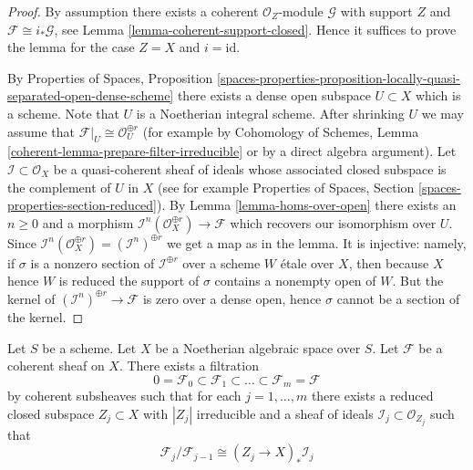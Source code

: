 \begin{proof}
By assumption there exists a coherent $\mathcal{O}_Z$-module
$\mathcal{G}$ with support $Z$ and $\mathcal{F} \cong i_*\mathcal{G}$, see
Lemma \ref{lemma-coherent-support-closed}. Hence it suffices to prove the
lemma for the case $Z = X$ and $i = \text{id}$.

\medskip\noindent
By Properties of Spaces, Proposition
\ref{spaces-properties-proposition-locally-quasi-separated-open-dense-scheme}
there exists a dense open subspace $U \subset X$ which is a scheme. Note that
$U$ is a Noetherian integral scheme. After shrinking $U$ we may assume
that $\mathcal{F}|_U \cong \mathcal{O}_U^{\oplus r}$ (for example by
Cohomology of Schemes, Lemma \ref{coherent-lemma-prepare-filter-irreducible}
or by a direct algebra argument). Let $\mathcal{I} \subset \mathcal{O}_X$
be a quasi-coherent sheaf of ideals whose associated closed subspace
is the complement of $U$ in $X$ (see for example
Properties of Spaces, Section \ref{spaces-properties-section-reduced}). 
By Lemma \ref{lemma-homs-over-open} there exists an $n \geq 0$ and a
morphism $\mathcal{I}^n(\mathcal{O}_X^{\oplus r}) \to \mathcal{F}$
which recovers our isomorphism over $U$. Since
$\mathcal{I}^n(\mathcal{O}_X^{\oplus r}) = (\mathcal{I}^n)^{\oplus r}$
we get a map as in the lemma. It is injective: namely, if $\sigma$ is
a nonzero section of $\mathcal{I}^{\oplus r}$ over a scheme $W$ \'etale
over $X$, then because $X$ hence $W$ is reduced the support of $\sigma$
contains a nonempty open of $W$. But the kernel of
$(\mathcal{I}^n)^{\oplus r} \to \mathcal{F}$ is zero
over a dense open, hence $\sigma$ cannot be a section of the kernel.
\end{proof}

\begin{lemma}
\label{lemma-coherent-filter}
Let $S$ be a scheme. Let $X$ be a Noetherian algebraic space over $S$.
Let $\mathcal{F}$ be a coherent sheaf on $X$. There exists a filtration
$$
0 = \mathcal{F}_0 \subset \mathcal{F}_1 \subset
\ldots \subset \mathcal{F}_m = \mathcal{F}
$$
by coherent subsheaves such that for each $j = 1, \ldots, m$
there exists a reduced closed subspace $Z_j \subset X$ with $|Z_j|$
irreducible and a sheaf of ideals $\mathcal{I}_j \subset \mathcal{O}_{Z_j}$
such that
$$
\mathcal{F}_j/\mathcal{F}_{j - 1}
\cong (Z_j \to X)_* \mathcal{I}_j
$$
\end{lemma}

